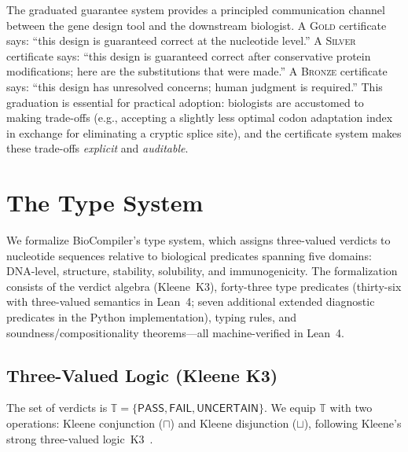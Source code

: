 \documentclass[acmsmall,review,anonymous]{acmart}
\newcommand{\PASS}{\ensuremath{\mathsf{PASS}}\xspace}
\newcommand{\FAIL}{\ensuremath{\mathsf{FAIL}}\xspace}
\newcommand{\UNCERTAIN}{\ensuremath{\mathsf{UNCERTAIN}}\xspace}
\newcommand{\tvl}{\mathbb{T}}
\newcommand{\GOLD}{\textsc{Gold}\xspace}
\newcommand{\SILVER}{\textsc{Silver}\xspace}
\newcommand{\BRONZE}{\textsc{Bronze}\xspace}
\begin{document}
The graduated guarantee system provides a principled communication
channel between the gene design tool and the downstream
biologist.
A \GOLD{} certificate says: ``this design is guaranteed correct at the
nucleotide level.''
A \SILVER{} certificate says: ``this design is guaranteed correct
after conservative protein modifications; here are the substitutions
that were made.''
A \BRONZE{} certificate says: ``this design has unresolved concerns;
human judgment is required.''
This graduation is essential for practical adoption: biologists are
accustomed to making trade-offs (e.g., accepting a slightly less
optimal codon adaptation index in exchange for eliminating a cryptic
splice site), and the certificate system makes these trade-offs
\emph{explicit} and \emph{auditable}.

\section{The Type System}\label{sec:typesys}

We formalize BioCompiler's type system, which assigns three-valued
verdicts to nucleotide sequences relative to biological predicates
spanning five domains: DNA-level, structure, stability, solubility,
and immunogenicity.
The formalization consists of the verdict algebra (Kleene~K3),
forty-three type predicates (thirty-six with three-valued semantics in Lean~4; seven additional extended diagnostic predicates in the Python implementation), typing
rules, and soundness/compositionality theorems---all machine-verified
in Lean~4.

\subsection{Three-Valued Logic (Kleene K3)}\label{sec:3vl}

The set of verdicts is $\tvl = \{\PASS, \FAIL, \UNCERTAIN\}$.
We equip $\tvl$ with two operations: Kleene conjunction ($\sqcap$) and
Kleene disjunction ($\sqcup$), following Kleene's strong three-valued
logic~K3~\cite{kleene1952introduction}.
\end{document}

